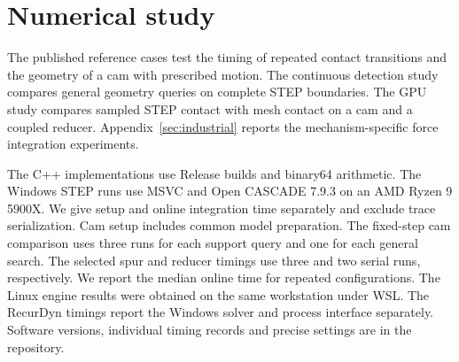 \section{Numerical study}
\label{sec:evaluation}
The published reference cases test the timing of repeated contact transitions and the geometry of a cam with prescribed motion. The continuous detection study compares general geometry queries on complete STEP boundaries. The GPU study compares sampled STEP contact with mesh contact on a cam and a coupled reducer. Appendix~\ref{sec:industrial} reports the mechanism-specific force integration experiments.

The C++ implementations use Release builds and binary64 arithmetic. The Windows STEP runs use MSVC and Open CASCADE 7.9.3 on an AMD Ryzen 9 5900X. We give setup and online integration time separately and exclude trace serialization. Cam setup includes common model preparation. The fixed-step cam comparison uses three runs for each support query and one for each general search. The selected spur and reducer timings use three and two serial runs, respectively. We report the median online time for repeated configurations. The Linux engine results were obtained on the same workstation under WSL. The RecurDyn timings report the Windows solver and process interface separately. Software versions, individual timing records and precise settings are in the repository.






